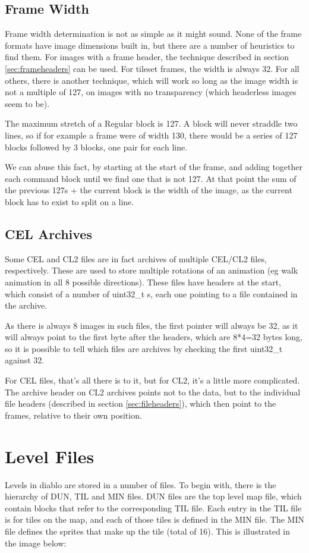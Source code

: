  	\subsection{Frame Width}
 	Frame width determination is not as simple as it might sound. None of the frame formats have image dimensions built in, but there are a number of heuristics to find them.
 	For images with a frame header, the technique described in section \ref{sec:frameheaders} can be used. 
 	For tileset frames, the width is always 32.
 	For all others, there is another technique, which will work so long as the image width is not a multiple of 127, on images with no transparency (which headerless images seem to be).
 	
 	The maximum stretch of a Regular block is 127. A block will never straddle two lines, so if for example a frame were of width 130, there would be a series of 127 blocks followed by 3 blocks, one pair for each line.
 	
 	We can abuse this fact, by starting at the start of the frame, and adding together each command block until we find one that is not 127. At that point the sum of the previous 127s + the current block is the width of the image, as the current block has to exist to split on a line.
 	
 	\subsection{CEL Archives}
 	Some CEL and CL2 files are in fact archives of multiple CEL/CL2 files, respectively. These are used to store multiple rotations of an animation (eg walk animation in all 8 possible directions). These files have headers at the start, which consist of a number of uint32\_t s, each one pointing to a file contained in the archive.
 	
 	As there is always 8 images in such files, the first pointer will always be 32, as it will always point to the first byte after the headers, which are 8*4=32 bytes long, so it is possible to tell which files are archives by checking the first uint32\_t against 32.
 	
 	For CEL files, that's all there is to it, but for CL2, it's a little more complicated. The archive header on CL2 archives points not to the data, but to the individual file headers (described in section \ref{sec:fileheaders}), which then point to the frames, relative to their own position.

\newpage

\section{Level Files}
    Levels in diablo are stored in a number of files. To begin with, there is the hierarchy of DUN, TIL and MIN files.
    DUN files are the top level map file, which contain blocks that refer to the corresponding TIL file. Each entry in the TIL file is for tiles on the map, and each of those tiles is defined in the MIN file. The MIN file defines the sprites that make up the tile (total of 16). This is illustrated in the image below:\\
    
